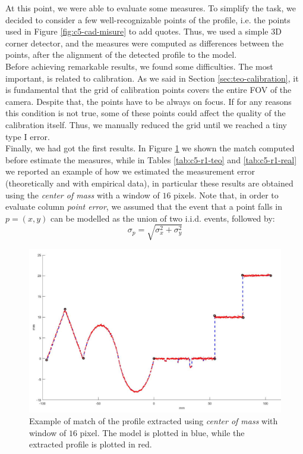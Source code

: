 At this point, we were able to evaluate some measures. To simplify the task, we decided to consider a few well-recognizable points of the profile, i.e. the points used in Figure \ref{fig:c5-cad-misure} to add quotes. Thus, we used a simple 3D corner detector, and the measures were computed as differences between the points, after the alignment of the detected profile to the model. \\
Before achieving remarkable results, we found some difficulties. The most important, is related to calibration. As we said in Section \ref{sec:teo-calibration}, it is fundamental that the grid of calibration points covers the entire \acs{FOV} of the camera. Despite that, the points have to be always on focus. If for any reasons this condition is not true, some of these points could affect the quality of the calibration itself. Thus, we manually reduced the grid until we reached a tiny type I error. \\

Finally, we had got the first results. In Figure \ref{fig:c5-match} we shown the match computed before estimate the measures, while in Tables \ref{tab:c5-r1-teo} and \ref{tab:c5-r1-real} we reported an example of how we estimated the measurement error (theoretically and with empirical data), in particular these results are obtained using the \textit{center of mass} with a window of $16$ pixels. Note that, in order to evaluate column \textit{point error}, we assumed that the event that a point falls in $p = (x, y)$ can be modelled as the union of two i.i.d. events, followed by:
  \begin{equation}
    \sigma_p = \sqrt{\sigma_x^2 + \sigma_y^2}
    \label{eq:exp:var-prop}
  \end{equation}
  \begin{figure}[t!]
    \centering
    \includegraphics[width=\textwidth]{./images/analysis/t1/example_cut.jpg}
    \caption{Example of match of the profile extracted using \textit{center of mass} with window of $16$ pixel. The model is plotted in blue, while the extracted profile is plotted in red.}
    \label{fig:c5-match}
  \end{figure}
  
  


